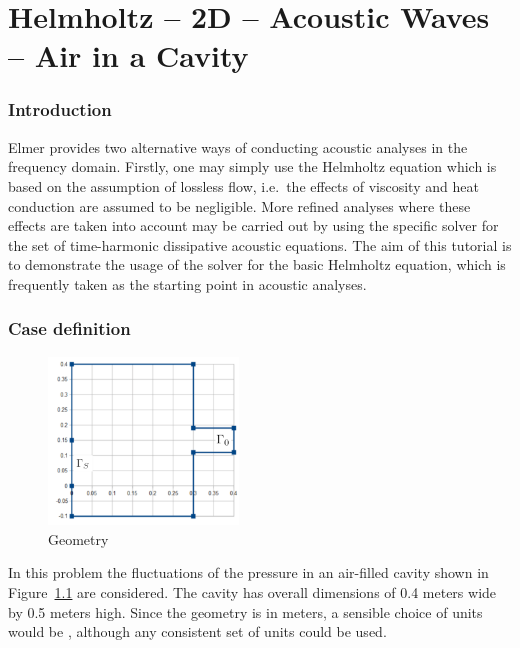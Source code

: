\chapter{Helmholtz -- 2D -- Acoustic Waves -- Air in a Cavity}



\subsection*{Introduction}

Elmer provides two alternative ways of conducting acoustic analyses in the frequency domain. Firstly, one may simply use the Helmholtz equation which is based on the assumption of lossless flow, i.e.\ the effects of viscosity and heat conduction are assumed to be negligible. More refined analyses where these effects are taken into account may be carried out by using the specific solver for the set of time-harmonic dissipative acoustic equations. The aim of this tutorial is to demonstrate the usage of the solver for the basic Helmholtz equation, which is frequently taken as the starting point in acoustic analyses. 

\subsection*{Case definition}

\begin{figure}
\centering
\includegraphics[width=0.45\textwidth]{geometry}
\caption{Geometry}\label{fg:geometry}
\end{figure}

In this problem the fluctuations of the pressure in an air-filled cavity shown in Figure~\ref{fg:geometry} are considered. The cavity has overall dimensions of 0.4 meters wide by 0.5 meters high.  Since the geometry is in meters, a sensible choice of units would be , although any consistent set of units could be used.

